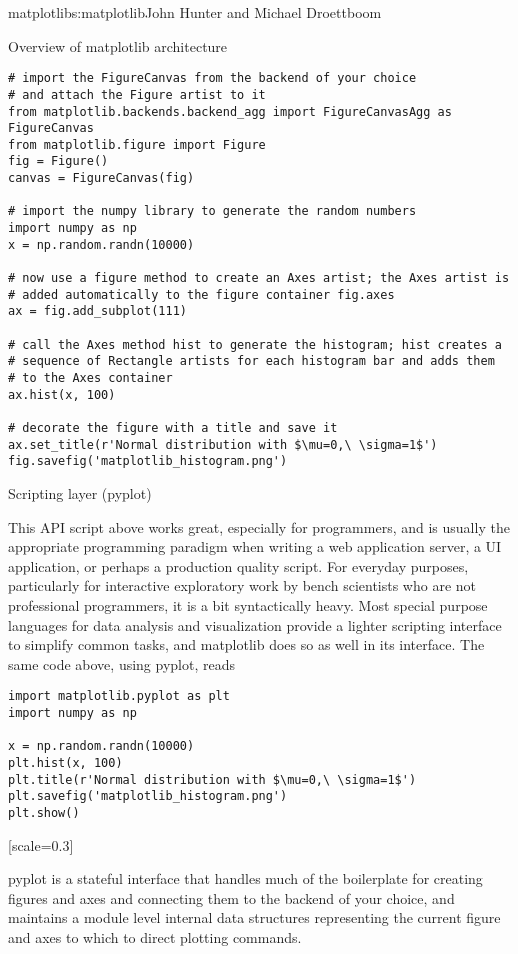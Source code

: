 \begin{aosachapter}{matplotlib}{s:matplotlib}{John Hunter and Michael Droettboom}
\begin{aosasect1}{Overview of matplotlib architecture}
\begin{verbatim}
# import the FigureCanvas from the backend of your choice
# and attach the Figure artist to it
from matplotlib.backends.backend_agg import FigureCanvasAgg as FigureCanvas
from matplotlib.figure import Figure
fig = Figure()
canvas = FigureCanvas(fig)

# import the numpy library to generate the random numbers
import numpy as np
x = np.random.randn(10000)

# now use a figure method to create an Axes artist; the Axes artist is
# added automatically to the figure container fig.axes
ax = fig.add_subplot(111)

# call the Axes method hist to generate the histogram; hist creates a
# sequence of Rectangle artists for each histogram bar and adds them
# to the Axes container
ax.hist(x, 100)

# decorate the figure with a title and save it
ax.set_title(r'Normal distribution with $\mu=0,\ \sigma=1$')
fig.savefig('matplotlib_histogram.png')
\end{verbatim}

\begin{aosasect2}{Scripting layer (pyplot)}


This API script above works great, especially for programmers, and is
usually the appropriate programming paradigm when writing a web
application server, a UI application, or perhaps a production quality
script.  For everyday purposes, particularly for interactive
exploratory work by bench scientists who are not professional
programmers, it is a bit syntactically heavy.  Most special purpose
languages for data analysis and visualization provide a lighter
scripting interface to simplify common tasks, and matplotlib does so
as well in its  interface.  The same code
above, using pyplot, reads

\begin{verbatim}
import matplotlib.pyplot as plt
import numpy as np

x = np.random.randn(10000)
plt.hist(x, 100)
plt.title(r'Normal distribution with $\mu=0,\ \sigma=1$')
plt.savefig('matplotlib_histogram.png')
plt.show()
\end{verbatim}

[scale=0.3]


pyplot is a stateful interface that handles much of the boilerplate
for creating figures and axes and connecting them to the backend of
your choice, and maintains a module level internal data structures
representing the current figure and axes to which to direct plotting
commands.


\end{aosasect2}
\end{aosasect1}
\end{aosachapter}
